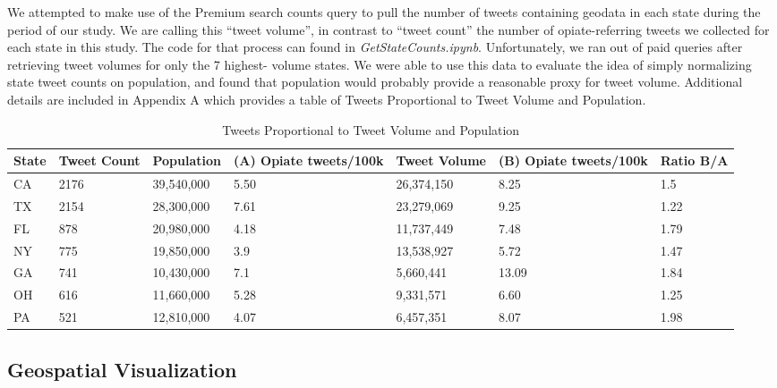 \documentclass[sigconf]{acmart}
\begin{document}
We attempted to make use of the Premium search counts query to pull the number 
of tweets containing geodata in each state during the period of our study. 
We are calling this ``tweet volume'', in contrast to ``tweet count'' the number 
of opiate-referring tweets we collected for each state in this study. The code 
for that process can found in \emph{GetStateCounts.ipynb}. Unfortunately, we 
ran out of paid queries after retrieving tweet volumes for only the 7 highest-
volume states. We were able to use this data to evaluate the idea of simply 
normalizing state tweet counts on population, and found that population would 
probably provide a reasonable proxy for tweet volume. Additional details are 
included in Appendix A which provides a table of Tweets Proportional to Tweet 
Volume and Population.

\begin{table}[ht]
\centering
\caption{Tweets Proportional to Tweet Volume and Population}
\label{tab:1}
  \begin{tabular}{lllllll}
    \toprule
    State & Tweet Count & Population & (A) Opiate tweets/100k & Tweet Volume & 
    (B) Opiate tweets/100k & Ratio B/A \\
    \midrule     
    CA& 2176& 39,540,000& 5.50& 26,374,150& 8.25& 1.5 \\
    TX& 2154& 28,300,000& 7.61& 23,279,069& 9.25& 1.22 \\
    FL& 878& 20,980,000& 4.18& 11,737,449& 7.48& 1.79 \\
    NY& 775& 19,850,000& 3.9& 13,538,927& 5.72& 1.47 \\
    GA& 741& 10,430,000& 7.1& 5,660,441& 13.09& 1.84 \\
    OH& 616& 11,660,000& 5.28& 9,331,571& 6.60 & 1.25 \\
    PA& 521& 12,810,000& 4.07& 6,457,351& 8.07& 1.98 \\	
    \bottomrule
  \end{tabular}
\end{table}



\subsection{Geospatial Visualization}
\end{document}
